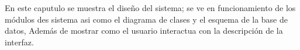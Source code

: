 En este caputulo se muestra el diseño del sistema; se ve en funcionamiento de los módulos des sistema asi como el diagrama de clases y el esquema de la base de datos, Además de mostrar como el usuario interactua con la descripción de la interfaz.





